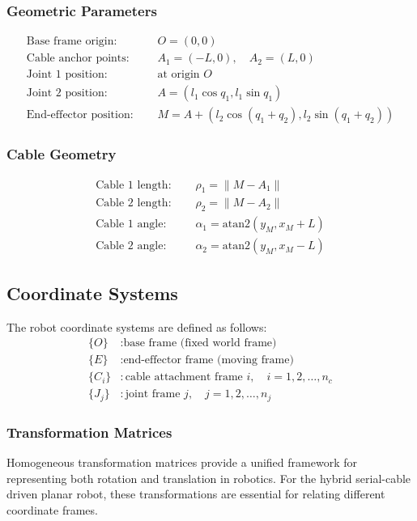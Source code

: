 \documentclass[11pt,a4paper]{article}
\begin{document}
\subsubsection{Geometric Parameters}
\begin{align}
\text{Base frame origin: } &\quad O = (0, 0) \\
\text{Cable anchor points: } &\quad A_1 = (-L, 0), \quad A_2 = (L, 0) \\
\text{Joint 1 position: } &\quad \text{at origin } O \\
\text{Joint 2 position: } &\quad A = (l_1 \cos q_1, l_1 \sin q_1) \\
\text{End-effector position: } &\quad M = A + (l_2 \cos(q_1 + q_2), l_2 \sin(q_1 + q_2))
\end{align}

\subsubsection{Cable Geometry}
\begin{align}
\text{Cable 1 length: } &\quad \rho_1 = \|M - A_1\| \\
\text{Cable 2 length: } &\quad \rho_2 = \|M - A_2\| \\
\text{Cable 1 angle: } &\quad \alpha_1 = \text{atan2}(y_M, x_M + L) \\
\text{Cable 2 angle: } &\quad \alpha_2 = \text{atan2}(y_M, x_M - L)
\end{align}

\subsection{Coordinate Systems}
The robot coordinate systems are defined as follows:
\begin{align}
\{O\} &: \text{base frame (fixed world frame)} \\
\{E\} &: \text{end-effector frame (moving frame)} \\
\{C_i\} &: \text{cable attachment frame } i, \quad i = 1, 2, \ldots, n_c \\
\{J_j\} &: \text{joint frame } j, \quad j = 1, 2, \ldots, n_j
\end{align}

\subsubsection{Transformation Matrices}
Homogeneous transformation matrices provide a unified framework for representing both rotation and translation in robotics. For the hybrid serial-cable driven planar robot, these transformations are essential for relating different coordinate frames.
\end{document}
